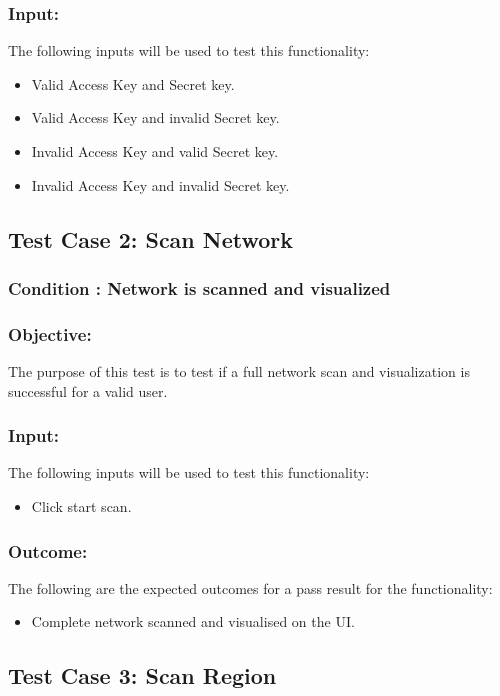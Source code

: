 \documentclass[hidelinks,a4paper,12pt]{article}
\begin{document}
\subsubsection{Input:}
 The following inputs will be used to test this functionality:
\begin{itemize}
  \item Valid Access Key and Secret key.
  \item Valid Access Key and invalid Secret key.
 \item Invalid Access Key and valid Secret key.
 \item Invalid Access Key and invalid Secret key.
\end{itemize}

\subsection{Test Case 2: Scan Network }
\subsubsection{Condition : Network is scanned and visualized}
\subsubsection{Objective:} The purpose of this test is to test if a full network scan and visualization is successful for a valid user.

\subsubsection{Input:}
 The following inputs will be used to test this functionality:
\begin{itemize}
  \item Click start scan.
\end{itemize}
\subsubsection{Outcome: }
The following are the expected outcomes for a pass result for the functionality:
\begin{itemize}
\item Complete network scanned and visualised on the UI.

\end{itemize}

\subsection{Test Case 3: Scan Region }
\end{document}
